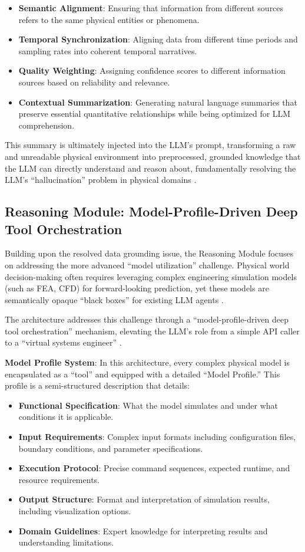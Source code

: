 \begin{itemize}
\item \textbf{Semantic Alignment}: Ensuring that information from different sources refers to the same physical entities or phenomena.
\item \textbf{Temporal Synchronization}: Aligning data from different time periods and sampling rates into coherent temporal narratives.
\item \textbf{Quality Weighting}: Assigning confidence scores to different information sources based on reliability and relevance.
\item \textbf{Contextual Summarization}: Generating natural language summaries that preserve essential quantitative relationships while being optimized for LLM comprehension.
\end{itemize}

This summary is ultimately injected into the LLM's prompt, transforming a raw and unreadable physical environment into preprocessed, grounded knowledge that the LLM can directly understand and reason about, fundamentally resolving the LLM's ``hallucination'' problem in physical domains \cite{ji2023survey}.

\subsection{Reasoning Module: Model-Profile-Driven Deep Tool Orchestration}

Building upon the resolved data grounding issue, the Reasoning Module focuses on addressing the more advanced ``model utilization'' challenge. Physical world decision-making often requires leveraging complex engineering simulation models (such as FEA, CFD) for forward-looking prediction, yet these models are semantically opaque ``black boxes'' for existing LLM agents \cite{hughes2012finite}.

The architecture addresses this challenge through a ``model-profile-driven deep tool orchestration'' mechanism, elevating the LLM's role from a simple API caller to a ``virtual systems engineer'' \cite{lu2022unified}.

\textbf{Model Profile System}: In this architecture, every complex physical model is encapsulated as a ``tool'' and equipped with a detailed ``Model Profile.'' This profile is a semi-structured description that details:

\begin{itemize}
\item \textbf{Functional Specification}: What the model simulates and under what conditions it is applicable.
\item \textbf{Input Requirements}: Complex input formats including configuration files, boundary conditions, and parameter specifications.
\item \textbf{Execution Protocol}: Precise command sequences, expected runtime, and resource requirements.
\item \textbf{Output Structure}: Format and interpretation of simulation results, including visualization options.
\item \textbf{Domain Guidelines}: Expert knowledge for interpreting results and understanding limitations.
\end{itemize}

